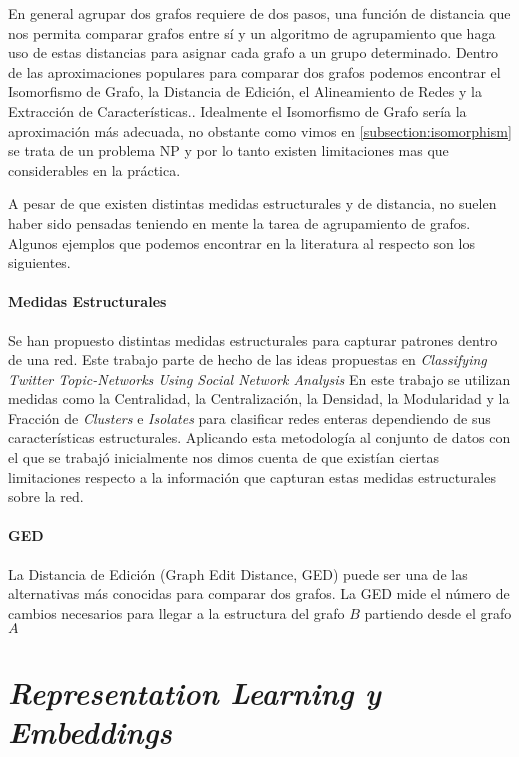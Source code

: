En general agrupar dos grafos requiere de dos pasos, una función de distancia que nos permita comparar grafos entre sí y un algoritmo de agrupamiento que haga uso de estas distancias para asignar cada grafo a un grupo determinado. Dentro de las aproximaciones populares para comparar dos grafos podemos encontrar el Isomorfismo de Grafo, la Distancia de Edición, el Alineamiento de Redes y la Extracción de Características.\cite{saxena_identifying_2019}.
Idealmente el Isomorfismo de Grafo sería la aproximación más adecuada, no obstante como vimos en \ref{subsection:isomorphism} se trata de un problema NP y por lo tanto existen limitaciones mas que considerables en la práctica.

A pesar de que existen distintas medidas estructurales y de distancia, no suelen haber sido pensadas teniendo en mente la tarea de agrupamiento de grafos. Algunos ejemplos que podemos encontrar en la literatura al respecto son los siguientes.

\paragraph{Medidas Estructurales} 
Se han propuesto distintas medidas estructurales para capturar patrones dentro de una red. Este trabajo parte de hecho de las ideas propuestas en \textit{Classifying Twitter Topic-Networks Using Social Network Analysis} \cite{himelboim_classifying_2017} En este trabajo se utilizan medidas como la Centralidad, la Centralización, la Densidad, la Modularidad y la Fracción de \textit{Clusters} e \textit{Isolates} para clasificar redes enteras dependiendo de sus características estructurales. Aplicando esta metodología al conjunto de datos con el que se trabajó inicialmente nos dimos cuenta de que existían ciertas limitaciones respecto a la información que capturan estas medidas estructurales sobre la red.

\paragraph{GED} La Distancia de Edición (Graph Edit Distance, GED) puede ser una de las alternativas más conocidas para comparar dos grafos. La GED mide el número de cambios necesarios para llegar a la estructura del grafo $B$ partiendo desde el grafo $A$



\section{\textit{Representation Learning y Embeddings}}

